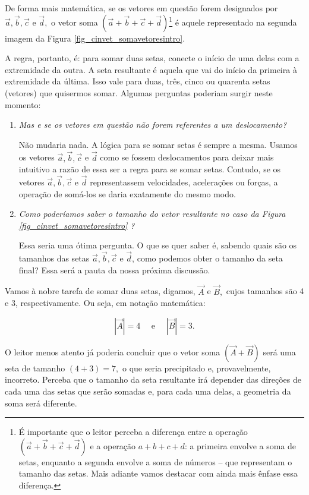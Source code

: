 De forma mais matemática, se os vetores em questão forem designados por $\vec{a},\vec{b}, \vec{c} $ e $\vec{d},$ o vetor soma $(\vec{a}+\vec{b}+\vec{c} +\vec{d})$\footnote{É importante que o leitor perceba a diferença entre a operação $(\vec{a}+\vec{b}+\vec{c} +\vec{d})$ e a operação $a+b+c+d$: a primeira envolve a soma de setas, enquanto a segunda envolve a soma de números -- que representam o tamanho das setas. Mais adiante vamos destacar com ainda mais ênfase essa diferença.} é aquele representado na segunda imagem da Figura \ref{fig_cinvet_somavetoresintro}.

A regra, portanto, é: para somar duas setas, conecte o início de uma delas com a extremidade da outra. A seta resultante é aquela que vai do início da primeira à extremidade da última. Isso vale para duas, três, cinco ou quarenta setas (vetores) que quisermos somar. Algumas perguntas poderiam surgir neste momento:

\begin{enumerate}
    \item [(i)] \textit{Mas e se os vetores em questão não forem referentes a um deslocamento?}

    Não mudaria nada. A lógica para se somar setas é sempre a mesma. Usamos os vetores $\vec{a},\vec{b}, \vec{c} $ e $\vec{d}$ como se fossem deslocamentos para deixar mais intuitivo a razão de essa ser a regra para se somar setas. Contudo, se os vetores $\vec{a},\vec{b}, \vec{c} $ e $\vec{d}$ representassem velocidades, acelerações ou forças, a operação de somá-los se daria exatamente do mesmo modo.
    
    \item [(ii)] \textit{Como poderíamos saber o tamanho do vetor resultante no caso da Figura \ref{fig_cinvet_somavetoresintro} ?}

    Essa seria uma ótima pergunta. O que se quer saber é, sabendo quais são os tamanhos das setas $\vec{a},\vec{b}, \vec{c} $ e $\vec{d}$, como podemos obter o tamanho da seta final? Essa será a pauta da nossa próxima discussão.
\end{enumerate}


Vamos à nobre tarefa de somar duas setas, digamos, $\vec{A}$ e $\vec{B},$ cujos tamanhos são 4 e 3, respectivamente. Ou seja, em notação matemática:

 $$|\vec{A}|=4 \quad \text{ e } \quad |\vec{B}|=3. $$

O leitor menos atento já poderia concluir que o vetor soma $(\vec{A}+\vec{B})$ será uma seta de tamanho $(4+3)=7,$ o que seria precipitado e, provavelmente, incorreto. Perceba que o tamanho da seta resultante irá depender das direções de cada uma das setas que serão somadas e, para cada uma delas, a geometria da soma será diferente. 

